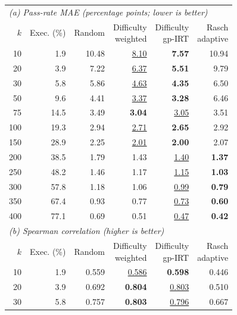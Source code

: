 \begin{table}[t]
  \centering
  \small
  \setlength{\tabcolsep}{3.5pt}
  \begin{tabular}{rrrrrr}
    \toprule
    \multicolumn{6}{l}{\textit{(a) Pass-rate MAE (percentage points; lower is better)}} \\
    $k$ & Exec. (\%) & Random & \shortstack{Difficulty\\weighted} & \shortstack{Difficulty\\gp-IRT} & \shortstack{Rasch\\adaptive} \\
    \midrule
    10 & 1.9 & 10.48 & \underline{8.10} & \textbf{7.57} & 10.94 \\
    20 & 3.9 & 7.22 & \underline{6.37} & \textbf{5.51} & 9.79 \\
    30 & 5.8 & 5.86 & \underline{4.63} & \textbf{4.35} & 6.50 \\
    50 & 9.6 & 4.41 & \underline{3.37} & \textbf{3.28} & 6.46 \\
    75 & 14.5 & 3.49 & \textbf{3.04} & \underline{3.05} & 3.51 \\
    100 & 19.3 & 2.94 & \underline{2.71} & \textbf{2.65} & 2.92 \\
    150 & 28.9 & 2.25 & \underline{2.01} & \textbf{2.00} & 2.07 \\
    200 & 38.5 & 1.79 & 1.43 & \underline{1.40} & \textbf{1.37} \\
    250 & 48.2 & 1.46 & 1.17 & \underline{1.15} & \textbf{1.03} \\
    300 & 57.8 & 1.18 & 1.06 & \underline{0.99} & \textbf{0.79} \\
    350 & 67.4 & 0.93 & 0.77 & \underline{0.73} & \textbf{0.60} \\
    400 & 77.1 & 0.69 & 0.51 & \underline{0.47} & \textbf{0.42} \\
    \midrule
    \multicolumn{6}{l}{\textit{(b) Spearman correlation (higher is better)}} \\
    $k$ & Exec. (\%) & Random & \shortstack{Difficulty\\weighted} & \shortstack{Difficulty\\gp-IRT} & \shortstack{Rasch\\adaptive} \\
    \midrule
    10 & 1.9 & 0.559 & \underline{0.586} & \textbf{0.598} & 0.446 \\
    20 & 3.9 & 0.692 & \textbf{0.804} & \underline{0.803} & 0.510 \\
    30 & 5.8 & 0.757 & \textbf{0.803} & \underline{0.796} & 0.667 \\

\end{tabular}
\end{table}
